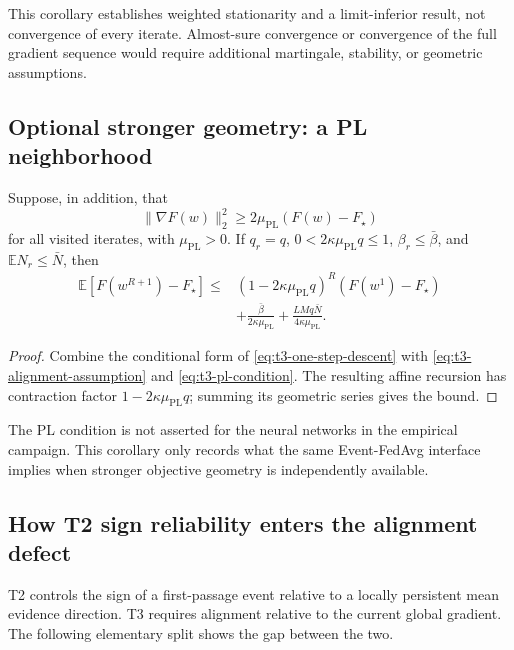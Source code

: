 This corollary establishes weighted stationarity and a limit-inferior result,
not convergence of every iterate.  Almost-sure convergence or convergence of
the full gradient sequence would require additional martingale, stability, or
geometric assumptions.

\subsection{Optional stronger geometry: a PL neighborhood}

\begin{corollary}
\label{cor:t3-pl}
Suppose, in addition, that
\begin{equation}
    \|\nabla F(w)\|_2^2
    \geq 2\mu_{\mathrm{PL}}(F(w)-F_\star)
    \label{eq:t3-pl-condition}
\end{equation}
for all visited iterates, with $\mu_{\mathrm{PL}}>0$.  If $q_r=q$,
$0<2\kappa\mu_{\mathrm{PL}}q\leq1$, $\beta_r\leq\bar\beta$, and
$\mathbb{E}N_r\leq\bar N$, then
\begin{align}
    \mathbb{E}[F(w^{R+1})-F_\star]
    \leq{}&
    (1-2\kappa\mu_{\mathrm{PL}}q)^R
    (F(w^1)-F_\star)
    \nonumber\\
    &+\frac{\bar\beta}{2\kappa\mu_{\mathrm{PL}}}
    +\frac{LMq\bar N}{4\kappa\mu_{\mathrm{PL}}}.
    \label{eq:t3-pl-neighborhood}
\end{align}
\end{corollary}

\begin{proof}
Combine the conditional form of \eqref{eq:t3-one-step-descent} with
\eqref{eq:t3-alignment-assumption} and \eqref{eq:t3-pl-condition}.  The
resulting affine recursion has contraction factor
$1-2\kappa\mu_{\mathrm{PL}}q$; summing its geometric series gives the bound.
\end{proof}

The PL condition is not asserted for the neural networks in the empirical
campaign.  This corollary only records what the same Event-FedAvg interface
implies when stronger objective geometry is independently available.

\subsection{How T2 sign reliability enters the alignment defect}

T2 controls the sign of a first-passage event relative to a locally persistent
mean evidence direction.  T3 requires alignment relative to the current global
gradient.  The following elementary split shows the gap between the two.

